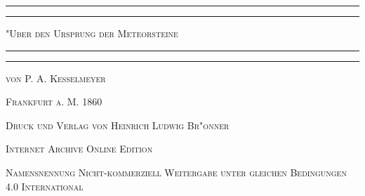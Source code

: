 \documentclass[a4paper, 8pt, oneside, polutonikogreek, german]{article}
\begin{document}
\renewcommand\thefootnote{{\bfseries\color{myGreen}{\arabic{footnote}}}}
\let\oldfootnote\footnote
    \renewcommand{\footnote}[1]{\oldfootnote{{\large\bfseries\color{myGreen}#1}}}
\begin{titlepage} %
	\centering %

	
	\rule{\textwidth}{1.6pt}\vspace*{-\baselineskip}\vspace*{2pt} %
	\rule{\textwidth}{0.4pt} %
	
	\vspace{1\baselineskip} %
	
	{\scshape\Huge "Uber den Ursprung der Meteorsteine}
	
	\vspace{1\baselineskip} %

	\rule{\textwidth}{0.4pt}\vspace*{-\baselineskip}\vspace{3.2pt} %
	\rule{\textwidth}{1.6pt} %
	
	\vspace{1\baselineskip} %
	
	
	{\Large\scshape von P. A. Kesselmeyer} %
	
	\vspace*{1\baselineskip} %
    
    \vspace*{\fill}

	\vspace{1\baselineskip}

	{\small\scshape Frankfurt a. M. 1860}
	
	{\small\scshape{Druck und Verlag von Heinrich Ludwig Br"onner}}
	
	\vspace{0.5\baselineskip} %

    \scshape Internet Archive Online Edition  %
	
	{\scshape\small Namensnennung Nicht-kommerziell Weitergabe unter gleichen Bedingungen 4.0 International} %
\end{titlepage}
\setlength{\parskip}{1mm plus1mm minus1mm}
\clearpage
\Large
\tableofcontents
\clearpage
\end{document}
